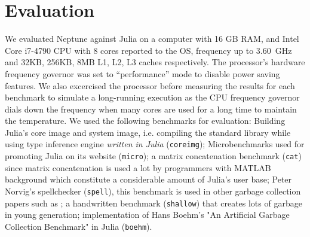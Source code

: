 \section{Evaluation} \label{evaluation}

We evaluated Neptune against Julia on a computer with 16 GB RAM, and Intel Core i7-4790 CPU with 8 cores reported to the OS, frequency up to $3.60$~GHz and 32KB, 256KB, 8MB L1, L2, L3 caches respectively.
The processor's hardware frequency governor was set to ``performance'' mode to disable power saving features.
We also excercised the processor before measuring the results for each benchmark to simulate a long-running execution as the CPU frequency governor dials down the frequency when many cores are used for a long time to maintain the temperature.
We used the following benchmarks for evaluation: Building Julia's core image and system image, i.e. compiling the standard library while using type inference engine \emph{written in Julia} (\texttt{coreimg}); Microbenchmarks used for promoting Julia on its website (\texttt{micro}); a matrix concatenation benchmark (\texttt{cat}) since matrix concatenation is used a lot by programmers with MATLAB background which constitute a considerable amount of Julia's user base; Peter Norvig's spellchecker (\texttt{spell}), this benchmark is used in other garbage collection papers such as \cite{marlow2008parallel}; a handwritten benchmark (\texttt{shallow}) that creates lots of garbage in young generation; implementation of Hans Boehm's "An Artificial Garbage Collection Benchmark" in Julia (\texttt{boehm}).

